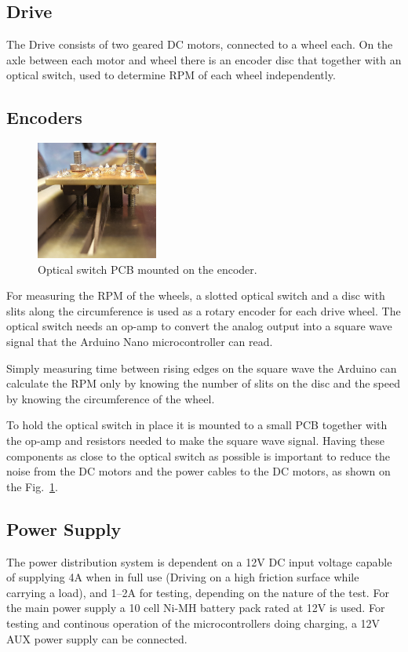\documentclass[11pt]{article}
\begin{document}
\subsection*{Drive}
The Drive consists of two geared DC motors, connected to a wheel each. On the axle between each motor and wheel there is an encoder disc that together with an optical switch, used to determine RPM of each wheel independently.

\subsection*{Encoders}
\begin{figure}
  \includegraphics[width=4cm]{mounted_encoder.jpg}
  \caption{Optical switch PCB mounted on the encoder.}
  \label{mounted-encoder}
\end{figure}


For measuring the RPM of the wheels, a slotted optical switch and a disc with slits along the circumference is used as a rotary encoder for each drive wheel. The optical switch needs an op-amp to convert the analog output into a square wave signal that the Arduino Nano microcontroller can read.


Simply measuring time between rising edges on the square wave the Arduino can calculate the RPM only by knowing the number of slits on the disc and the speed by knowing the circumference of the wheel.


To hold the optical switch in place it is mounted to a small PCB together with the op-amp and resistors needed to make the square wave signal. Having these components as close to the optical switch as possible is important to reduce the noise from the DC motors and the power cables to the DC motors, as shown on the Fig.~\ref{mounted-encoder}.
\subsection*{Power Supply}


The power distribution system is dependent on a 12V DC input voltage capable of supplying 4A when in full use (Driving on a high friction surface while carrying a load), and 1--2A for testing, depending on the nature of the test. For the main power supply a 10 cell Ni-MH battery pack rated at 12V is used. For testing and continous operation of the microcontrollers doing charging, a 12V AUX power supply can be connected.
\end{document}
